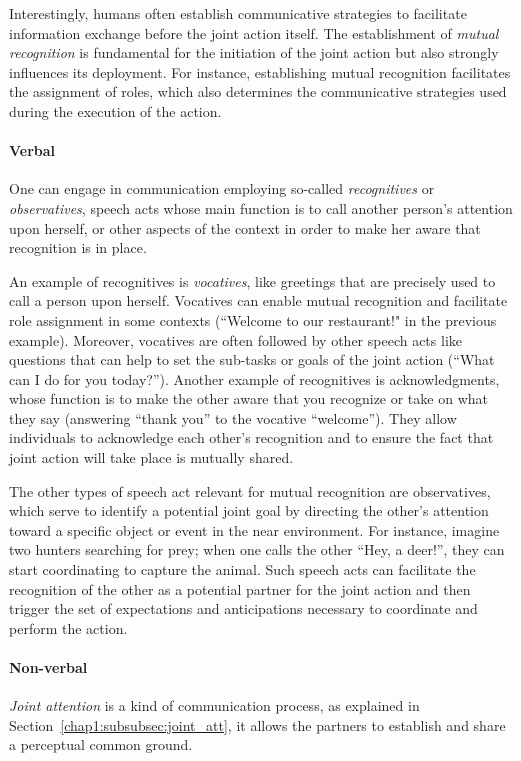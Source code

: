 \documentclass[a4paper,11pt,twoside]{StyleThese}
\begin{document}
Interestingly, humans often establish communicative strategies to facilitate information exchange before the joint action itself. The establishment of \textit{mutual recognition} is fundamental for the initiation of the joint action but also strongly influences its deployment. For instance, establishing mutual recognition facilitates the assignment of roles, which also determines the communicative strategies used during the execution of the action. 

\paragraph{Verbal} One can engage in communication employing so-called \textit{recognitives} or \textit{observatives}, speech acts whose main function is to call another person’s attention upon herself, or other aspects of the context in order to make her aware that recognition is in place. 

An example of recognitives is \textit{vocatives}, like greetings that are precisely used to call a person upon herself. Vocatives can enable mutual recognition and facilitate role assignment in some contexts (\eg ``Welcome to our restaurant!" in the previous example). Moreover, vocatives are often followed by other speech acts like questions that can help to set the sub-tasks or goals of the joint action (\eg ``What can I do for you today?''). Another example of recognitives is acknowledgments, whose function is to make the other aware that you recognize or take on what they say (\eg answering ``thank you'' to the vocative ``welcome''). They allow individuals to acknowledge each other's recognition and to ensure the fact that joint action will take place is mutually shared. 

The other types of speech act relevant for mutual recognition are observatives, which serve to identify a potential joint goal by directing the other’s attention toward a specific object or event in the near environment. For instance, imagine two hunters searching for prey; when one calls the other ``Hey, a deer!'', they can start coordinating to capture the animal. Such speech acts can facilitate the recognition of the other as a potential partner for the joint action and then trigger the set of expectations and anticipations necessary to coordinate and perform the action.

\paragraph{Non-verbal} \textit{Joint attention} is a kind of communication process, as explained in Section~\ref{chap1:subsubsec:joint_att}, it allows the partners to establish and share a perceptual common ground.
\end{document}
